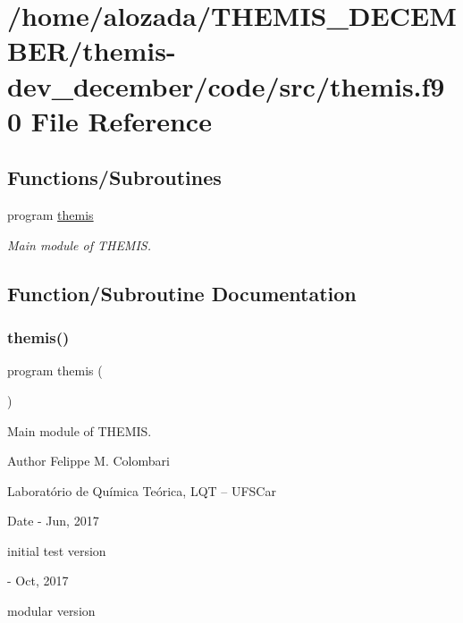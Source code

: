 \hypertarget{themis_8f90}{}\section{/home/alozada/\+T\+H\+E\+M\+I\+S\+\_\+\+D\+E\+C\+E\+M\+B\+E\+R/themis-\/dev\+\_\+december/code/src/themis.f90 File Reference}
\label{themis_8f90}
\subsection*{Functions/\+Subroutines}
\begin{DoxyCompactItemize}
\item 
program \hyperlink{themis_8f90_a9fc0d5fc4c1bc4e9a810629a4d8cf52a}{themis}
\begin{DoxyCompactList}\small\item\em Main module of T\+H\+E\+M\+IS. \end{DoxyCompactList}\end{DoxyCompactItemize}


\subsection{Function/\+Subroutine Documentation}
\mbox{\label{themis_8f90_a9fc0d5fc4c1bc4e9a810629a4d8cf52a}} 
\subsubsection{\texorpdfstring{themis()}{themis()}}
{\footnotesize\ttfamily program themis (\begin{DoxyParamCaption}{ }\end{DoxyParamCaption})}



Main module of T\+H\+E\+M\+IS. 

\begin{DoxyAuthor}{Author}
Felippe M. Colombari
\begin{DoxyItemize}
\item Laboratório de Química Teórica, L\+QT -- U\+F\+S\+Car 
\end{DoxyItemize}
\end{DoxyAuthor}
\begin{DoxyDate}{Date}
-\/ Jun, 2017
\begin{DoxyItemize}
\item initial test version 
\end{DoxyItemize}

-\/ Oct, 2017
\begin{DoxyItemize}
\item modular version 
\end{DoxyItemize}
\end{DoxyDate}


